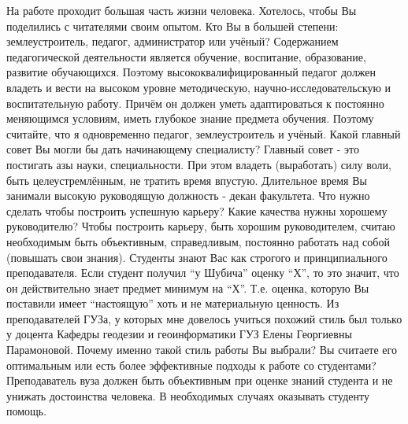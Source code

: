 \begin{drama}
	\maxspeaks На работе проходит большая часть жизни человека. Хотелось, чтобы Вы поделились с читателями своим опытом. Кто Вы в большей степени: землеустроитель, педагог, администратор или учёный?
	\michaelspeaks Содержанием педагогической деятельности является обучение, воспитание, образование, развитие обучающихся. Поэтому высококвалифицированный педагог должен владеть и вести на высоком уровне методическую, научно-исследовательскую и воспитательную работу. Причём он должен уметь адаптироваться к постоянно меняющимся условиям, иметь глубокое знание предмета обучения. Поэтому считайте, что я одновременно педагог, землеустроитель и учёный.
	\maxspeaks Какой главный совет Вы могли бы дать начинающему специалисту?
	\michaelspeaks Главный совет - это постигать азы науки, специальности. При этом владеть (выработать) силу воли, быть целеустремлённым, не тратить время впустую.
	\maxspeaks Длительное время Вы занимали высокую руководящую должность - декан факультета. Что нужно сделать чтобы построить успешную карьеру? Какие качества нужны хорошему руководителю?
	\michaelspeaks Чтобы построить карьеру, быть хорошим руководителем, считаю необходимым быть объективным, справедливым, постоянно работать над собой (повышать свои знания).
	\maxspeaks Студенты знают Вас как строгого и принципиального преподавателя. Если студент получил “у Шубича” оценку “Х”, то это значит, что он действительно знает предмет минимум на “Х”. Т.е. оценка, которую Вы поставили имеет “настоящую” хоть и не материальную ценность. Из преподавателей ГУЗа, у которых мне довелось учиться похожий стиль был только у доцента Кафедры геодезии и геоинформатики ГУЗ Елены Георгиевны Парамоновой. Почему именно такой стиль работы Вы выбрали? Вы считаете его оптимальным или есть более эффективные подходы к работе со студентами?
	\michaelspeaks Преподаватель вуза должен быть объективным при оценке знаний студента и не унижать достоинства человека. В необходимых случаях оказывать студенту помощь.


\end{drama}
